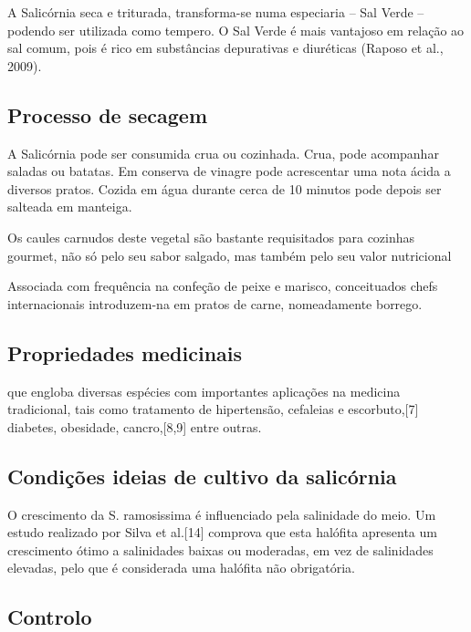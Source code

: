 A Salicórnia seca e triturada, transforma-se numa especiaria – Sal Verde – podendo ser utilizada como tempero. O Sal Verde é mais vantajoso em relação ao sal comum, pois é rico em substâncias depurativas e diuréticas (Raposo et al., 2009).

\subsection{Processo de secagem}




A Salicórnia pode ser consumida crua ou cozinhada. Crua,
pode acompanhar saladas ou batatas. Em conserva de vinagre pode acrescentar uma nota ácida a diversos pratos. Cozida em água durante cerca
de 10 minutos pode depois ser salteada em manteiga.

Os caules carnudos deste vegetal são bastante
requisitados para cozinhas gourmet, não só pelo seu sabor salgado, mas também pelo seu valor nutricional 




Associada com frequência na confeção de peixe e marisco, conceituados chefs internacionais introduzem-na em pratos de carne, nomeadamente borrego.



\subsection{Propriedades medicinais}



que engloba diversas
espécies com importantes aplicações na medicina tradicional, tais como tratamento de
hipertensão, cefaleias e escorbuto,[7] diabetes, obesidade, cancro,[8,9] entre outras.






\subsection{Condições ideias de cultivo da salicórnia}


O crescimento da S. ramosissima é influenciado pela salinidade do meio. Um estudo realizado por Silva et al.[14] comprova que esta halófita apresenta um crescimento ótimo a salinidades baixas ou moderadas, em vez de salinidades elevadas, pelo que é considerada uma halófita não obrigatória. \cite{Silva2007}




\subsection{Controlo}

